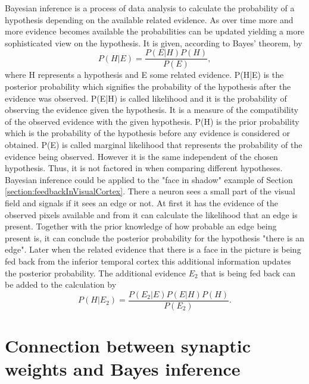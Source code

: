 Bayesian inference is a process of data analysis to calculate the probability of a hypothesis depending on the available related evidence. As over time more and more evidence becomes available the probabilities can be updated yielding a more sophisticated view on the hypothesis. It is given, according to Bayes' theorem, by
\begin{equation}
\label{eqn:bayesianInference}
P(H|E) = \frac{P(E|H)P(H)}{P(E)},
\end{equation}
where H represents a hypothesis and E some related evidence. P(H|E) is the posterior probability which signifies the probability of the hypothesis after the evidence was observed. P(E|H) is called likelihood and it is the probability of observing the evidence 	given the hypothesis. It is a measure of the compatibility of the observed evidence with the given hypothesis. P(H) is the prior probability which is the probability of the hypothesis before any evidence is considered or obtained. P(E) is called marginal likelihood that represents the probability of the evidence being observed. However it is the same independent of the chosen hypothesis. Thus, it is not factored in when comparing different hypotheses.
Bayesian inference could be applied to the "face in shadow" example of Section \ref{section:feedbackInVisualCortex}. There a neuron sees a small part of the visual field and signals if it sees an edge or not. At first it has the evidence of the observed pixels available and from it can calculate the likelihood that an edge is present. Together with the prior knowledge of how probable an edge being present is, it can conclude the posterior probability for the hypothesis "there is an edge". Later when the related evidence that there is a face in the picture is being fed back from the inferior temporal cortex this additional information updates the posterior probability. The additional evidence $E_2$ that is being fed back can be added to the calculation by
\begin{equation}
\label{eqn:bayesianInference}
P(H|E_2) = \frac{P(E_2|E)P(E|H)P(H)}{P(E_2)}.
\end{equation}
\citep{bayesInferenceBook}

\section{Connection between synaptic weights and Bayes inference}

